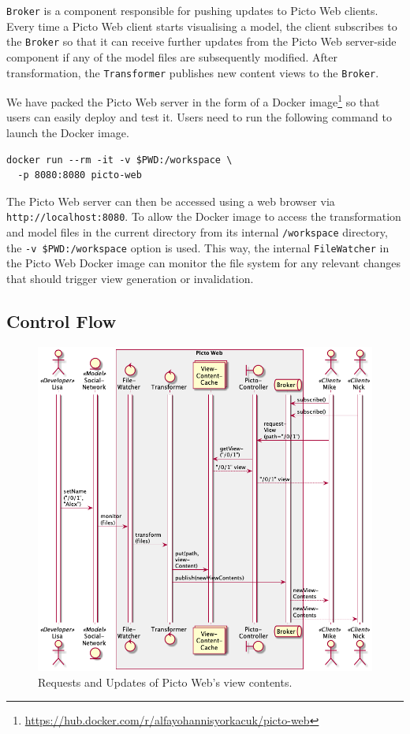 \documentclass[sigconf,review]{acmart}
\begin{document}
\texttt{Broker} is a component responsible for pushing updates to Picto Web clients. Every time a Picto Web client starts visualising a model, the client subscribes to the \texttt{Broker} so that it can receive further updates from the Picto Web server-side component if any of the model files are subsequently modified. After transformation, the \texttt{Transformer} publishes new content views to the \texttt{Broker}.

We have packed the Picto Web server in the form of a Docker image\footnote{\url{https://hub.docker.com/r/alfayohannisyorkacuk/picto-web}} so that users can easily deploy and test it. Users need to run the following command to launch the Docker image.

\begin{verbatim}
docker run --rm -it -v $PWD:/workspace \
  -p 8080:8080 picto-web
\end{verbatim}

The Picto Web server can then be accessed using a web browser via \texttt{http://localhost:8080}. To allow the Docker image to access the transformation and model files in the current directory from its internal \texttt{/workspace} directory, the \texttt{-v \$PWD:/workspace} option is used. This way, the internal \texttt{FileWatcher} in the Picto Web Docker image can monitor the file system for any relevant changes that should trigger view generation or invalidation.

\subsection{Control Flow}

\begin{figure}[h]
  \centering
  \includegraphics[width=0.89\linewidth]{images/sequence.png}
  \caption{Requests and Updates of Picto Web's view contents.}
  \label{fig:sequence}
\end{figure}
\end{document}
